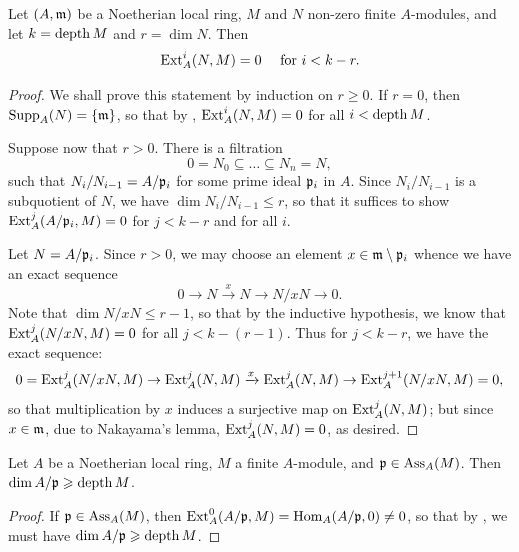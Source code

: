 \begin{theorem}[Ischebeck]
    Let $(A,\mathfrak{m})$ be a Noetherian local ring, $M$ and $N$ non-zero finite $A$-modules, and let $k = \operatorname{depth} M$ and $r = \dim N$. Then 
    \begin{equation*}
        \operatorname{Ext}^i_A(N, M) = 0 \quad\text{ for } i < k - r.
    \end{equation*}
\end{theorem}
\begin{proof}
    We shall prove this statement by induction on $r\ge 0$. If $r = 0$, then $\operatorname{Supp}_A(N) = \{\mathfrak{m}\}$, so that by , $\operatorname{Ext}^i_A(N, M) = 0$ for all $i < \operatorname{depth} M$. 

    Suppose now that $r > 0$. There is a filtration 
    \begin{equation*}
        0 = N_0\subseteq\dots\subseteq N_n = N,
    \end{equation*}
    such that $N_i/N_{i - 1} = A/\mathfrak{p}_i$ for some prime ideal $\mathfrak{p}_i$ in $A$. Since $N_i/N_{i - 1}$ is a subquotient of $N$, we have $\dim N_i/N_{i - 1}\le r$, so that it suffices to show $\operatorname{Ext}^j_A(A/\mathfrak{p}_i, M) = 0$ for $j < k - r$ and for all $i$. 
    
    Let $N = A/\mathfrak{p}_i$. Since $r > 0$, we may choose an element $x\in\mathfrak{m}\setminus\mathfrak{p}_i$ whence we have an exact sequence 
    \begin{equation*}
        0\to N\xrightarrow{x} N\to N/xN\to 0.
    \end{equation*}
    Note that $\dim N/xN\le r - 1$, so that by the inductive hypothesis, we know that $\operatorname{Ext}^j_A(N/xN, M) = 0$ for all $j < k - (r - 1)$. Thus for $j < k - r$, we have the exact sequence: 
    \begin{equation*}
        0 = \operatorname{Ext}^j_A(N/xN, M)\to\operatorname{Ext}^j_A(N, M)\xrightarrow{x}\operatorname{Ext}^j_A(N, M)\to\operatorname{Ext}^{j + 1}_A(N/xN, M) = 0,
    \end{equation*}
    so that multiplication by $x$ induces a surjective map on $\operatorname{Ext}^j_A(N, M)$; but since $x\in\mathfrak{m}$, due to Nakayama's lemma, $\operatorname{Ext}^j_A(N, M) = 0$, as desired.
\end{proof}

\begin{corollary}
    Let $A$ be a Noetherian local ring, $M$ a finite $A$-module, and $\mathfrak{p}\in\operatorname{Ass}_A(M)$. Then $\dim A/\mathfrak{p}\geqslant\operatorname{depth} M$.
\end{corollary}
\begin{proof}
    If $\mathfrak{p}\in\operatorname{Ass}_A(M)$, then $\operatorname{Ext}^0_A(A/\mathfrak{p}, M) = \operatorname{Hom}_A(A/\mathfrak{p}, 0)\ne 0$, so that by , we must have $\dim A/\mathfrak{p}\geqslant\operatorname{depth} M$.
\end{proof}

